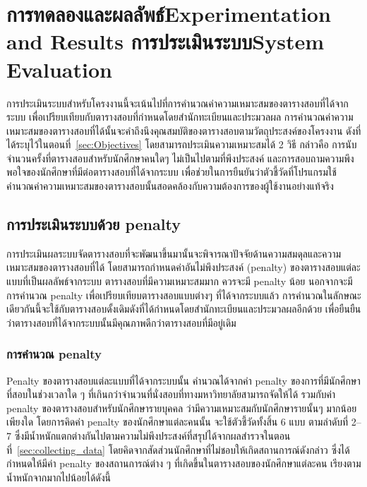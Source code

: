 \chapter{\ifproject%
\ifcpe การทดลองและผลลัพธ์\else Experimentation and Results\fi
\else%
\ifcpe การประเมินระบบ\else System Evaluation\fi
\fi}

การประเมินระบบสำหรับโครงงานนี้จะเน้นไปที่การคำนวณค่าความเหมาะสมของตารางสอบที่ได้จากระบบ เพื่อเปรียบเทียบกับตารางสอบที่กำหนดโดยสำนักทะเบียนและประมวลผล 
\enskip การคำนวณค่าความเหมาะสมของตารางสอบที่ได้นั้นจะคำถึงนึงคุณสมบัติของตารางสอบตามวัตถุประสงค์ของโครงงาน ดังที่ได้ระบุไว้ในตอนที่~\ref{sec:Objectives} 
โดยสามารถประเมินความเหมาะสมได้ 2 วิธี กล่าวคือ การนับจำนวนครั้งที่ตารางสอบสำหรับนักศึกษาคนใดๆ ไม่เป็นไปตามที่พึงประสงค์ และการสอบถามความพึงพอใจของนักศึกษาที่มีต่อตารางสอบที่ได้จากระบบ เพื่อช่วยในการยืนยันว่าตัวชี้วัดที่โปรแกรมใช้คำนวณค่าความเหมาะสมของตารางสอบนั้นสอดคล้องกับความต้องการของผู้ใช้งานอย่างแท้จริง

\section{การประเมินระบบด้วย penalty}
การประเมินผลระบบจัดตารางสอบที่จะพัฒนาขึ้นมานั้นจะพิจารณาปัจจัยด้านความสมดุลและความเหมาะสมของตารางสอบที่ได้ โดยสามารถกำหนดค่าอันไม่พึงประสงค์ (penalty) ของตารางสอบแต่ละแบบที่เป็นผลลัพธ์จากระบบ
\enskip ตารางสอบที่มีความเหมาะสมมาก ควรจะมี penalty น้อย
\enskip นอกจากจะมีการคำนวณ penalty เพื่อเปรียบเทียบตารางสอบแบบต่างๆ ที่ได้จากระบบแล้ว การคำนวณในลักษณะเดียวกันนี้จะใช้กับตารางสอบดั้งเดิมดังที่ได้กำหนดโดยสำนักทะเบียนและประมวลผลอีกด้วย เพื่อยืนยืนว่าตารางสอบที่ได้จากระบบนั้นมีคุณภาพดีกว่าตารางสอบที่มีอยู่เดิม

\subsection{การคำนวณ penalty}
Penalty ของตารางสอบแต่ละแบบที่ได้จากระบบนั้น คำนวณได้จากค่า penalty ของการที่มีนักศึกษาที่สอบในช่วงเวลาใด ๆ ที่เกินกว่าจํานวนที่นั่งสอบที่ทางมหาวิทยาลัยสามารถจัดให้ได้
รวมกับค่า penalty ของตารางสอบสำหรับนักศึกษารายบุคคล ว่ามีความเหมาะสมกับนักศึกษารายนั้นๆ มากน้อยเพียงใด 
โดยการคิดค่า penalty ของนักศึกษาแต่ละคนนั้น จะใช้ตัวชี้วัดทั้งสิ้น 6 แบบ ตามลำดับที่ 2--7 ซึ่งมีน้ำหนักแตกต่างกันไปตามความไม่พึงประสงค์ที่สรุปได้จากผลสำรวจในตอนที่~\ref{sec:collecting_data} 
โดยคิดจากสัดส่วนนักศึกษาที่ไม่ชอบให้เกิดสถานการณ์ดังกล่าว ซึ่งได้กำหนดให้มีค่า penalty ของสถานการณ์ต่าง ๆ ที่เกิดขึ้นในตารางสอบของนักศึกษาแต่ละคน เรียงตามน้ำหนักจากมากไปน้อยได้ดังนี้
  
